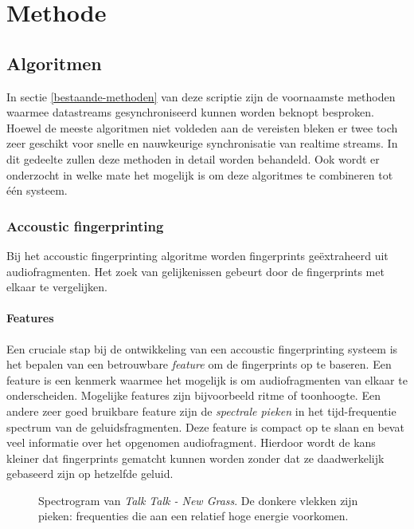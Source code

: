 \chapter{Methode}

\section{Algoritmen}

In sectie \ref{bestaande-methoden} van deze scriptie zijn de voornaamste methoden waarmee datastreams gesynchroniseerd kunnen worden beknopt besproken. Hoewel de meeste algoritmen niet voldeden aan de vereisten bleken er twee toch zeer geschikt voor snelle en nauwkeurige synchronisatie van realtime streams. In dit gedeelte zullen deze methoden in detail worden behandeld. Ook wordt er onderzocht in welke mate het mogelijk is om deze algoritmes te combineren tot één systeem.

\subsection{Accoustic fingerprinting}
\label{accoustic-fingerprinting}

Bij het accoustic fingerprinting algoritme worden fingerprints geëxtraheerd uit audiofragmenten. Het zoek van gelijkenissen gebeurt door de fingerprints met elkaar te vergelijken. 

\subsubsection{Features}

Een cruciale stap bij de ontwikkeling van een accoustic fingerprinting systeem is het bepalen van een betrouwbare \textit{feature} om de fingerprints op te baseren. Een feature is een kenmerk waarmee het mogelijk is om audiofragmenten van elkaar te onderscheiden. Mogelijke features zijn bijvoorbeeld ritme of toonhoogte. Een andere zeer goed bruikbare feature zijn de \textit{spectrale pieken} in het tijd-frequentie spectrum van de geluidsfragmenten. Deze feature is compact op te slaan en bevat veel informatie over het opgenomen audiofragment. Hierdoor wordt de kans kleiner dat fingerprints gematcht kunnen worden zonder dat ze daadwerkelijk gebaseerd zijn op hetzelfde geluid.

\begin{figure}[h!]
	\captionsetup{width=0.7\textwidth}
	\caption[Voorbeeld van een spectrogram]{Spectrogram van \textit{Talk Talk - New Grass}. De donkere vlekken zijn pieken: frequenties die aan een relatief hoge energie voorkomen.}
	\begin{center}
		\advance\parskip0.3cm
		
	\end{center}
	\label{spectrogram}
\end{figure}

